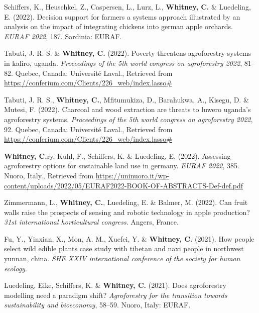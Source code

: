 \documentclass[11pt,a4paper,]{awesome-cv}
\newlength{\cslhangindent}
\newenvironment{CSLReferences}[2] %
 {\begin{list}{}{%
  \setlength{\itemindent}{0pt}
  \setlength{\leftmargin}{0pt}
  \setlength{\parsep}{0pt}
  \ifodd #1
   \setlength{\leftmargin}{\cslhangindent}
   \setlength{\itemindent}{-1\cslhangindent}
  \fi
  \setlength{\itemsep}{#2\baselineskip}}}
 {\end{list}}
\begin{document}
\begin{CSLReferences}{1}{0}
Schiffers, K., Heuschkel, Z., Caspersen, L., Lurz, L.,
\textbf{Whitney, C.} \& Luedeling, E. (2022). Decision support for
farmers a systems approach illustrated by an analysis on the impact of
integrating chickens into german apple orchards. \emph{EURAF 2022}, 187.
Sardinia: EURAF.

Tabuti, J. R. S. \& \textbf{Whitney, C.} (2022). Poverty threatens
agroforestry systems in kaliro, uganda. \emph{Proceedings of the 5th
world congress on agroforestry 2022}, 81--82. Quebec, Canada: Université
Laval., Retrieved from
\url{https://conferium.com/Clients/226_web/index.lasso\#}

Tabuti, J. R. S., \textbf{Whitney, C.}, Mfitumukiza, D., Barahukwa, A.,
Kisegu, D. \& Mutesi, F. (2022). Charcoal and wood extraction are
threats to luwero uganda's agroforestry systems. \emph{Proceedings of
the 5th world congress on agroforestry 2022}, 92. Quebec, Canada:
Université Laval., Retrieved from
\url{https://conferium.com/Clients/226_web/index.lasso\#}

\textbf{Whitney, C.}ry, Kuhl, F., Schiffers, K. \& Luedeling, E. (2022).
Assessing agroforestry options for sustainable land use in germany.
\emph{EURAF 2022}, 385. Nuoro, Italy., Retrieved from
\url{https://uninuoro.it/wp-content/uploads/2022/05/EURAF2022-BOOK-OF-ABSTRACTS-Def-def.pdf}

Zimmermann, L., \textbf{Whitney, C.}, Luedeling, E. \& Balmer, M.
(2022). Can fruit walls raise the prospects of sensing and robotic
technology in apple production? \emph{31st international horticultural
congress}. Angers, France.

Fu, Y., Yinxian, X., Mon, A. M., Xuefei, Y. \& \textbf{Whitney, C.}
(2021). How people select wild edible plants case study with tibetan and
naxi people in northwest yunnan, china. \emph{SHE XXIV international
conference of the society for human ecology}.

Luedeling, Eike, Schiffers, K. \& \textbf{Whitney, C.} (2021). Does
agroforestry modelling need a paradigm shift? \emph{Agroforestry for the
transition towards sustainability and bioeconomy}, 58--59. Nuoro, Italy:
EURAF.


\end{CSLReferences}
\end{document}
